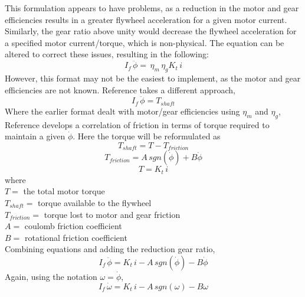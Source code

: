 \documentclass[12pt,letterpaper]{article}
\begin{document}
This formulation appears to have problems, as a reduction in the motor and gear efficiencies results in a 
greater flywheel acceleration for a given motor current.  Similarly, the gear ratio above unity would 
decrease the flywheel acceleration for a specified motor current/torque, which is non-physical.  The equation can be altered
to correct these issues, resulting in the following:
%
\begin{equation}
	I_{f} \, \ddot{\phi} = \, \eta_{m} \, \eta_{g} K_{t} \, i
\end{equation}
%
However, this format may not be the easiest to implement, as the motor and gear efficiencies are not known.  Reference \cite{monograph}
takes a different approach,
%
\begin{equation}
    I_{f} \, \ddot{\phi} = T_{shaft}
\end{equation}
%
Where the earlier format dealt with motor/gear efficiencies using $\eta_{m}$ and $\eta_{g}$, Reference \cite{monograph} develops a correlation of friction in terms of torque required to maintain a given $\dot{\phi}$.  Here the torque will be
reformulated as 
%
\begin{equation}
    T_{shaft} = T - T_{friction}
\end{equation}
%
\begin{equation}
    T_{friction} = A \, sgn(\dot{\phi} ) + B \dot{\phi} 
\end{equation}
%
\begin{equation}
    T = K_{t} \, i
\end{equation}
%
where \\
$T =$ the total motor torque \\
$T_{shaft} =$ torque available to the flywheel \\
$T_{friction} =$ torque lost to motor and gear friction \\
$A =$ coulomb friction coefficient \\
$B =$ rotational friction coefficient \\

Combining equations and adding the reduction gear ratio,
%
\begin{equation}
    I_{f} \, \ddot{\phi}  = K_{t} \, i - A \, sgn(\dot{\phi} ) - B \dot{\phi}
\end{equation}
%
Again, using the notation $\omega = \dot{\phi}$,
%
\begin{equation}
    I_{f} \, \dot{\omega}  = K_{t} \, i - A \, sgn(\omega) - B \omega \label{wheel}
\end{equation}
%
\end{document}

